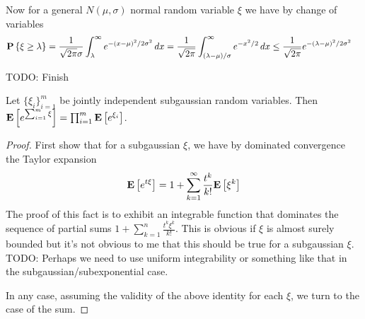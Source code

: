 \begin{examp}
Now for a general $N(\mu, \sigma)$ normal random variable $\xi$ we
have by change of variables
\begin{align*}
\textbf{P}\left \{\xi \geq \lambda \right \} &= 
\frac{1}{\sqrt{2\pi} \sigma} \int_\lambda^\infty e^{-(x-\mu)^2/2\sigma^2} \, dx = 
\frac{1}{\sqrt{2\pi}} \int_{(\lambda-\mu)/\sigma}^\infty e^{-x^2/2} \,
dx \leq \frac{1}{\sqrt{2\pi}} e^{-(\lambda-\mu)^2/2\sigma^2}
\end{align*}

TODO: Finish
\end{examp}

\begin{lem}Let $\{\xi_i\}_{i=1}^m$ be jointly independent subgaussian random variables.  Then $\textbf{E}\left[e^{\sum_{i=1}^m \xi}\right] =
  \prod_{i=1}^m \textbf{E}\left[e^{\xi_i}\right]$.
\end{lem}
\begin{proof}
First show that for a subgaussian $\xi$, we have by dominated
convergence the Taylor expansion 
$$\textbf{E}\left[e^{t\xi}\right] = 1 + \sum_{k=1}^\infty
\frac{t^k}{k!}\textbf{E}\left[\xi^k\right]$$
The proof of this fact is to exhibit an integrable function that
dominates the sequence of partial sums $1+\sum_{k=1}^n
\frac{t^k\xi^k}{k!}$.  This is obvious if $\xi$ is almost surely
bounded but it's not obvious to me that this should be true for a
subgaussian $\xi$.  TODO: Perhaps we need to use uniform integrability or
something like that in the subgaussian/subexponential case.

In any case, assuming the validity of the above identity for each
$\xi$, we turn to the case of the sum.
\end{proof}

